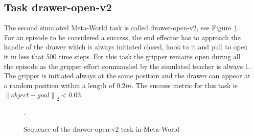 \subsection{Task drawer-open-v2}
\label{subsection:metaworld-open-drawer-task}


The second simulated Meta-World task is called drawer-open-v2, see Figure \ref{fig:sequence-drawer}. For an episode to be considered a success, the end effector has to approach the handle of the drawer which is always initiated closed, hook to it and pull to open it in less that 500 time steps.
For this task the gripper remains open during all the episode as the gripper effort commanded by the simulated teacher is always 1. The gripper is initiated always at the same position and the drawer can appear at a random position within a length of $0.2m$. The success metric for this task is ${\left\lVert object-goal \right\rVert}_2 < 0.03$.
 




 \begin{figure}[H]
  \centering
  \hspace*{\fill}%
   \hfill
   \hfill
  \hspace*{\fill}%
  \caption{Sequence of the drawer-open-v2 task in Meta-World}.
  \label{fig:sequence-drawer}
\end{figure}



